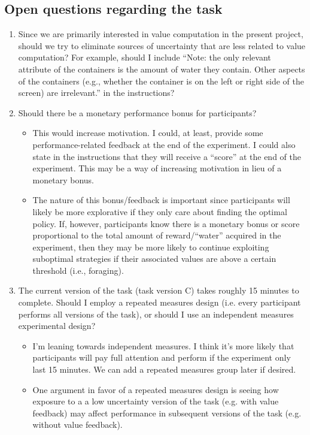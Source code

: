 \documentclass[11pt]{article}
\begin{document}
\subsection{Open questions regarding the task}
\label{sec:org926c39e}
\begin{enumerate}
\item Since we are primarily interested in value computation in the present project, should we try to eliminate sources of uncertainty that are less related to value computation? For example, should I include ``Note: the only relevant attribute of the containers is the amount of water they contain. Other aspects of the containers (e.g., whether the container is on the left or right side of the screen) are irrelevant.'' in the instructions?
\item Should there be a monetary performance bonus for participants?
\begin{itemize}
\item This would increase motivation. I could, at least, provide some performance-related feedback at the end of the experiment. I could also state in the instructions that they will receive a ``score'' at the end of the experiment. This may be a way of increasing motivation in lieu of a monetary bonus.
\item The nature of this bonus/feedback is important since participants will likely be more explorative if they only care about finding the optimal policy. If, however, participants know there is a monetary bonus or score proportional to the total amount of reward/``water'' acquired in the experiment, then they may be more likely to continue exploiting suboptimal strategies if their associated values are above a certain threshold (i.e., foraging).
\end{itemize}
\item The current version of the task (task version C) takes roughly 15 minutes to complete. Should I employ a repeated measures design (i.e. every participant performs all versions of the task), or should I use an independent measures experimental design?
\begin{itemize}
\item I'm leaning towards independent measures. I think it's more likely that participants will pay full attention and perform if the experiment only last 15 minutes. We can add a repeated measures group later if desired.
\item One argument in favor of a repeated measures design is seeing how exposure to a a low uncertainty version of the task (e.g. with value feedback) may affect performance in subsequent versions of the task (e.g. without value feedback).
\end{itemize}
\end{enumerate}
\end{document}

